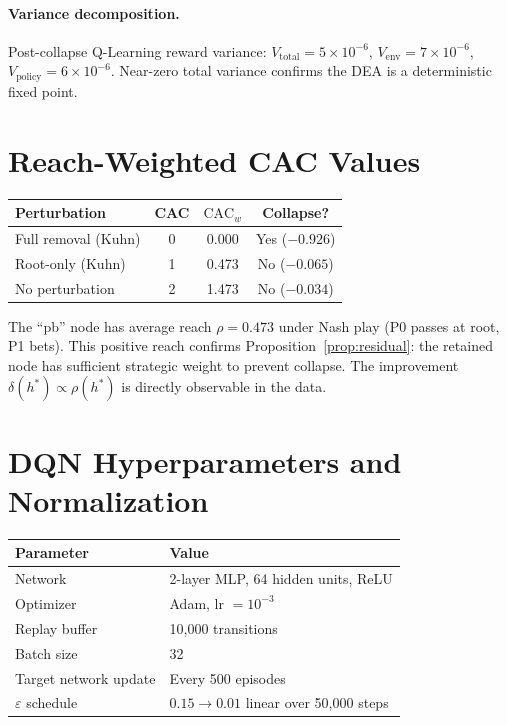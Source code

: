\documentclass{article}
\begin{document}
\paragraph{Variance decomposition.}
Post-collapse Q-Learning reward variance: $V_{\text{total}} = 5 \times 10^{-6}$, $V_{\text{env}} = 7 \times 10^{-6}$, $V_{\text{policy}} = 6 \times 10^{-6}$. Near-zero total variance confirms the DEA is a deterministic fixed point.

\section{Reach-Weighted CAC Values}
\label{app:cac-w}

\begin{center}
\begin{tabular}{lccc}
\toprule
Perturbation & CAC & $\text{CAC}_w$ & Collapse? \\
\midrule
Full removal (Kuhn) & 0 & 0.000 & Yes ($-0.926$) \\
Root-only (Kuhn) & 1 & 0.473 & No ($-0.065$) \\
No perturbation & 2 & 1.473 & No ($-0.034$) \\
\bottomrule
\end{tabular}
\end{center}

The ``pb'' node has average reach $\rho = 0.473$ under Nash play (P0 passes at root, P1 bets). This positive reach confirms Proposition~\ref{prop:residual}: the retained node has sufficient strategic weight to prevent collapse. The improvement $\delta(h^*) \propto \rho(h^*)$ is directly observable in the data.

\section{DQN Hyperparameters and Normalization}
\label{app:dqn-details}

\begin{center}
\begin{tabular}{ll}
\toprule
Parameter & Value \\
\midrule
Network & 2-layer MLP, 64 hidden units, ReLU \\
Optimizer & Adam, lr $= 10^{-3}$ \\
Replay buffer & 10{,}000 transitions \\
Batch size & 32 \\
Target network update & Every 500 episodes \\
$\varepsilon$ schedule & $0.15 \to 0.01$ linear over 50{,}000 steps \\
\bottomrule
\end{tabular}
\end{center}
\end{document}

